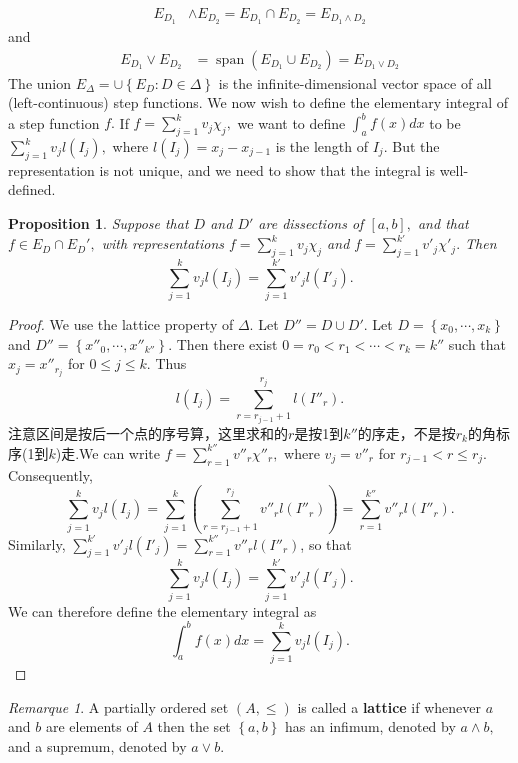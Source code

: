 \documentclass[12pt]{book}
\theoremstyle{definition}\newtheorem{dfn}{Définition}[chapter]
\theoremstyle{plain}\newtheorem{thm}{Théorème}[chapter]
\theoremstyle{plain}\newtheorem{prp}{Proposition}[chapter]
\theoremstyle{plain}\newtheorem{lem}{\bf Lemme}[chapter]
\theoremstyle{plain}\newtheorem{axm}{\bf Axiome}[chapter]
\theoremstyle{plain}\newtheorem{lmm}{\bf Lemme}[chapter]
\theoremstyle{plain}\newtheorem{exm}{\bf Example}[chapter]
\theoremstyle{plain}\newtheorem{cor}{\bf Corollaire}[chapter]
\theoremstyle{remark}\newtheorem{rem}{Remarque}[chapter]
\begin{document}
$$
\begin{aligned}
  E_{D_{1}} & \wedge E_{D_{2}}=E_{D_{1}} \cap E_{D_{2}}=E_{D_{1} \wedge D_{2}}
\end{aligned}
$$
and
$$
\begin{aligned}
 E_{D_{1}} \vee E_{D_{2}} &=\operatorname{span}\left(E_{D_{1}} \cup E_{D_{2}}\right)=E_{D_{1} \vee D_{2}}
\end{aligned}
$$
The union $E_{\Delta}=\cup\left\{E_{D}: D \in \Delta\right\}$ is the infinite-dimensional vector space of all (left-continuous) step functions.
We now wish to define the elementary integral of a step function $f .$ If $f=\sum_{j=1}^{k} v_{j} \chi_{j},$ we want to define $\int_{a}^{b} f(x) d x$ to be $\sum_{j=1}^{k} v_{j} l\left(I_{j}\right),$ where $l\left(I_{j}\right)=x_{j}-x_{j-1}$ is the length of $I_{j} .$ But the representation is not unique, and we need to show that the integral is well-defined.
\begin{prp}
  Suppose that $D$ and $D'$ are dissections of $[a, b],$ and that $f \in E_D\cap E_D' ,$ with representations $f =\sum^k_{j=1} v_j\chi_j$ and $f =\sum^{k'}_{j=1} v'_j\chi'_j .$ Then $$\sum^k_{j=1}v_jl(I_j)=\sum^{k'}_{j=1} v'_j l(I'_j).$$
\end{prp}
\begin{proof} We use the lattice property of $\Delta.$ Let $D'' = D \cup D'.$ Let $D = \left\{x_0,\cdots,x_k\right\}$ and $D'' = \left\{x''_0,\cdots,x''_{k''}\right\}.$ Then there exist $0 = r_0 < r_1 < \cdots < r_k = k''$ such that $x_j = x''_{r_j}$ for $0 \le j \le k.$ Thus $$l(I_j) =\sum^{r_j}_{r=r_{j−1}+1} l(I''_r).$$ 注意区间是按后一个点的序号算，这里求和的$r$是按1到$k''$的序走，不是按$r_{k}$的角标序(1到$k$)走.We can write $f =\sum^{k''}_{r=1} v''_r\chi''_r,$ where $v_j = v''_r$ for $r_{j−1} < r \le r_j.$ Consequently, $$\sum^k_{j=1}v_j l(I_j) = \sum^k_{j=1} \left( \sum^{r_j}_{r=r_{j−1}+1} v''_r l(I''_r )\right) = \sum^{k''}_{r=1} v''_r l(I''_r).$$
Similarly, $\sum^{k'}_{j=1}v'_j l(I'_j)=\sum^{k''}_{r=1} v''_r l(I''_r)$, so that $$\sum^k_{j=1}v_jl(I_j)=\sum^{k'}_{j=1} v'_j l(I'_j).$$
We can therefore define the elementary integral as $$\int_{a}^{b} f(x) d x=  \sum^k_{j=1}v_jl(I_j).$$
\end{proof}
\begin{rem}
A partially ordered set $(A, \le)$ is called a {\bf{lattice}} if
whenever $a$ and $b$ are elements of $A$ then the set $\left\{a,
  b\right\}$ has an infimum, denoted by $a\wedge b,$ and a supremum,
denoted by $a \vee b.$
\end{rem}
\end{document}

